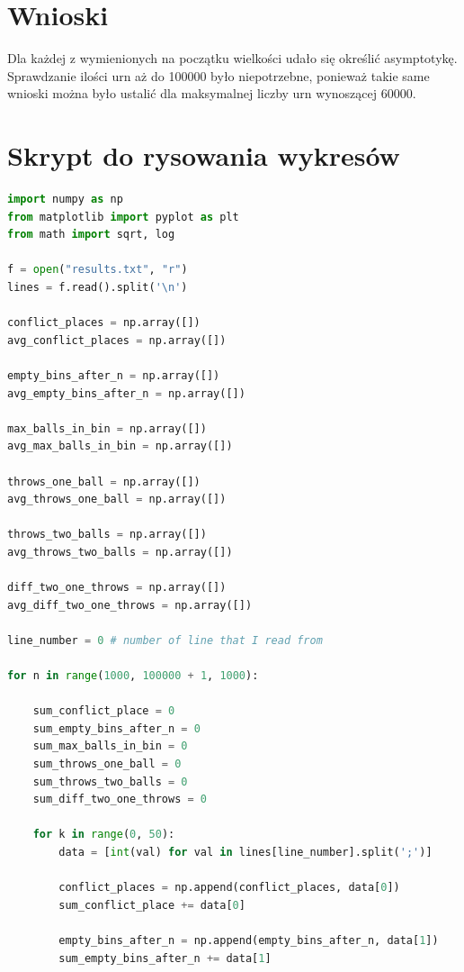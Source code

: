 \documentclass[12pt]{article}
\begin{document}
\section{Wnioski}

Dla każdej z wymienionych na początku wielkości udało się określić asymptotykę. Sprawdzanie ilości urn aż do 100000 było niepotrzebne, ponieważ takie same wnioski można było ustalić dla maksymalnej liczby urn wynoszącej 60000.

\newpage

\section*{Skrypt do rysowania wykresów}

\begin{lstlisting}[language=Python, caption=plot\_graphs.py]
%config InlineBackend.figure_formats = ['svg']
import numpy as np
from matplotlib import pyplot as plt
from math import sqrt, log
        
f = open("results.txt", "r")
lines = f.read().split('\n')
        
conflict_places = np.array([])
avg_conflict_places = np.array([])
        
empty_bins_after_n = np.array([])
avg_empty_bins_after_n = np.array([])
        
max_balls_in_bin = np.array([])
avg_max_balls_in_bin = np.array([])
        
throws_one_ball = np.array([])
avg_throws_one_ball = np.array([])
        
throws_two_balls = np.array([])
avg_throws_two_balls = np.array([])
        
diff_two_one_throws = np.array([])
avg_diff_two_one_throws = np.array([])
        
line_number = 0 # number of line that I read from
        
for n in range(1000, 100000 + 1, 1000):
        
    sum_conflict_place = 0
    sum_empty_bins_after_n = 0
    sum_max_balls_in_bin = 0
    sum_throws_one_ball = 0
    sum_throws_two_balls = 0
    sum_diff_two_one_throws = 0
        
    for k in range(0, 50):
        data = [int(val) for val in lines[line_number].split(';')]
        
        conflict_places = np.append(conflict_places, data[0])
        sum_conflict_place += data[0]
        
        empty_bins_after_n = np.append(empty_bins_after_n, data[1])
        sum_empty_bins_after_n += data[1]
        

\end{lstlisting}
\end{document}
